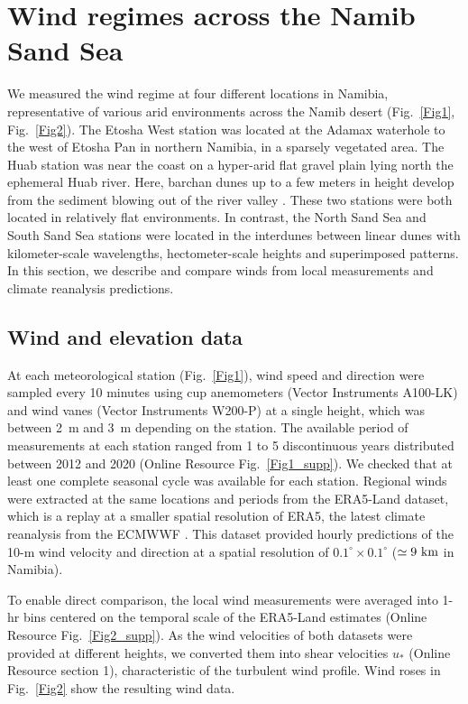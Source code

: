 \section{Wind regimes across the Namib Sand Sea}
We measured the wind regime at four different locations in Namibia, representative of various arid environments across the Namib desert (Fig.~\ref{Fig1}, Fig.~\ref{Fig2}). The Etosha West station was located at the Adamax waterhole to the west of Etosha Pan in northern Namibia, in a sparsely vegetated area. The Huab station was near the coast on a hyper-arid flat gravel plain lying north the ephemeral Huab river. Here, barchan dunes up to a few meters in height develop from the sediment blowing out of the river valley \citep{Nield2017, Hesp1998}. These two stations were both located in relatively flat environments. In contrast, the North Sand Sea and South Sand Sea stations were located in the interdunes between linear dunes with kilometer-scale wavelengths, hectometer-scale heights and superimposed patterns. In this section, we describe and compare winds from local measurements and climate reanalysis predictions.

\subsection{Wind and elevation data}
At each meteorological station (Fig.~\ref{Fig1}), wind speed and direction were sampled every 10 minutes using cup anemometers (Vector Instruments A100-LK) and wind vanes (Vector Instruments W200-P) at a single height, which was between 2~m and 3~m depending on the station. The available period of measurements at each station ranged from 1 to 5 discontinuous years distributed between 2012 and 2020 (Online Resource Fig.~\ref{Fig1_supp}). We checked that at least one complete seasonal cycle was available for each station. Regional winds were extracted at the same locations and periods from the ERA5-Land dataset, which is a replay at a smaller spatial resolution of ERA5, the latest climate reanalysis from the ECMWWF \citep{Hersbach2020, munoz2021}. This dataset provided hourly predictions of the 10-m wind velocity and direction at a spatial resolution of $0.1^\circ\times0.1^\circ$ ($\simeq 9~\textup{km}$ in Namibia).

To enable direct comparison, the local wind measurements were averaged into 1-hr bins centered on the temporal scale of the ERA5-Land estimates (Online Resource Fig.~\ref{Fig2_supp}). As the wind velocities of both datasets were provided at different heights, we converted them into shear velocities $u_{*}$ (Online Resource section 1), characteristic of the turbulent wind profile. Wind roses in Fig.~\ref{Fig2} show the resulting wind data.


